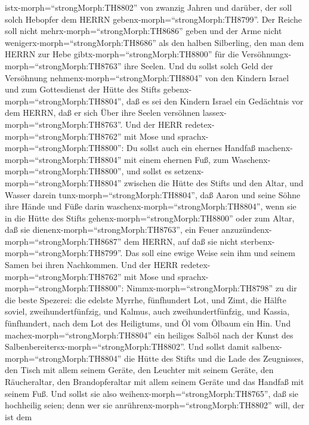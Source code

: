 istx-morph=``strongMorph:TH8802'' von zwanzig Jahren und darüber, der
soll solch Hebopfer dem HERRN gebenx-morph=``strongMorph:TH8799''.
 Der Reiche soll nicht mehrx-morph=``strongMorph:TH8686''
geben und der Arme nicht wenigerx-morph=``strongMorph:TH8686'' als den
halben Silberling, den man dem HERRN zur Hebe
gibtx-morph=``strongMorph:TH8800'' für die
Versöhnungx-morph=``strongMorph:TH8763'' ihre Seelen.  Und
du sollst solch Geld der Versöhnung nehmenx-morph=``strongMorph:TH8804''
von den Kindern Israel und zum Gottesdienst der Hütte des Stifts
gebenx-morph=``strongMorph:TH8804'', daß es sei den Kindern Israel ein
Gedächtnis vor dem HERRN, daß er sich Über ihre Seelen versöhnen
lassex-morph=``strongMorph:TH8763''.  Und der HERR
redetex-morph=``strongMorph:TH8762'' mit Mose und
sprachx-morph=``strongMorph:TH8800'':  Du sollst auch ein
ehernes Handfaß machenx-morph=``strongMorph:TH8804'' mit einem ehernen
Fuß, zum Waschenx-morph=``strongMorph:TH8800'', und sollst es
setzenx-morph=``strongMorph:TH8804'' zwischen die Hütte des Stifts und
den Altar, und Wasser darein tunx-morph=``strongMorph:TH8804'',
 daß Aaron und seine Söhne ihre Hände und Füße darin
waschenx-morph=``strongMorph:TH8804'',  wenn sie in die
Hütte des Stifts gehenx-morph=``strongMorph:TH8800'' oder zum Altar, daß
sie dienenx-morph=``strongMorph:TH8763'', ein Feuer
anzuzündenx-morph=``strongMorph:TH8687'' dem HERRN,  auf
daß sie nicht sterbenx-morph=``strongMorph:TH8799''. Das soll eine ewige
Weise sein ihm und seinem Samen bei ihren Nachkommen.  Und
der HERR redetex-morph=``strongMorph:TH8762'' mit Mose und
sprachx-morph=``strongMorph:TH8800'': 
Nimmx-morph=``strongMorph:TH8798'' zu dir die beste Spezerei: die
edelste Myrrhe, fünfhundert Lot, und Zimt, die Hälfte soviel,
zweihundertfünfzig, und Kalmus, auch zweihundertfünfzig, 
und Kassia, fünfhundert, nach dem Lot des Heiligtums, und Öl vom Ölbaum
ein Hin.  Und machex-morph=``strongMorph:TH8804'' ein
heiliges Salböl nach der Kunst des
Salbenbereitersx-morph=``strongMorph:TH8802''.  Und sollst
damit salbenx-morph=``strongMorph:TH8804'' die Hütte des Stifts und die
Lade des Zeugnisses,  den Tisch mit allem seinem Geräte,
den Leuchter mit seinem Geräte, den Räucheraltar,  den
Brandopferaltar mit allem seinem Geräte und das Handfaß mit seinem Fuß.
 Und sollst sie also weihenx-morph=``strongMorph:TH8765'',
daß sie hochheilig seien; denn wer sie
anrührenx-morph=``strongMorph:TH8802'' will, der ist dem
